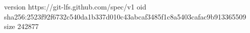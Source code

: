 version https://git-lfs.github.com/spec/v1
oid sha256:2523f92f6732c540da1b337d010c43abcaf3485f1c8a5403cafac9b913365509
size 242877
